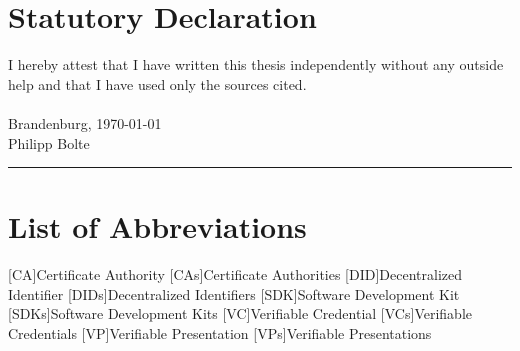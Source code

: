 
\usepackage[utf8]{inputenc}

\newcommand*{\mytitle}{Self-sovereign Identity: \\Development of an Implementation-based Evaluation Framework for Verifiable Credential SDKs} %
\newcommand*{\myinstitute}{Brandenburg University of Applied Sciences} %
\newcommand*{\myfaculty}{Department of Economics} %
\newcommand*{\myauthor}{Philipp Bolte} %
\newcommand*{\myreporttype}{Master's Thesis} %
\newcommand*{\mydate}{\today} %




	
\pagestyle{empty}

\newpage 					%
\thispagestyle{empty}
\quad 
\newpage
{}
 
\cleardoubleoddpage


\chapter*{Statutory Declaration}
I hereby attest that I have written this thesis independently without any outside help and that I have used only the sources cited. \\~\\
Brandenburg, \today\\[.6cm]
Philipp Bolte\\
\rule[0.5em]{20em}{0.5pt}



\tableofcontents			%
\listoffigures				%
\listoftables				%
\lstlistoflistings
\chapter*{List of Abbreviations}
    \begin{acronym}[SDK]
        [CA]{Certificate Authority}
        [CAs]{Certificate Authorities}
        [DID]{Decentralized Identifier}
        [DIDs]{Decentralized Identifiers}
        [SDK]{Software Development Kit}
        [SDKs]{Software Development Kits}
        [VC]{Verifiable Credential}
        [VCs]{Verifiable Credentials}
        [VP]{Verifiable Presentation}
        [VPs]{Verifiable Presentations}
    \end{acronym}

